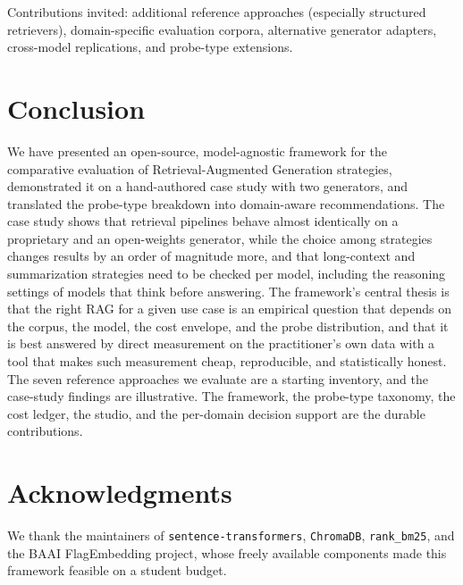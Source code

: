 \documentclass[conference,a4paper,10pt]{IEEEtran}
\begin{document}
Contributions invited: additional reference approaches (especially structured retrievers), domain-specific evaluation corpora, alternative generator adapters, cross-model replications, and probe-type extensions.

\section{Conclusion}
\label{sec:conclusion}

We have presented an open-source, model-agnostic framework for the comparative evaluation of Retrieval-Augmented Generation strategies, demonstrated it on a hand-authored case study with two generators, and translated the probe-type breakdown into domain-aware recommendations.
The case study shows that retrieval pipelines behave almost identically on a proprietary and an open-weights generator, while the choice among strategies changes results by an order of magnitude more, and that long-context and summarization strategies need to be checked per model, including the reasoning settings of models that think before answering.
The framework's central thesis is that the right RAG for a given use case is an empirical question that depends on the corpus, the model, the cost envelope, and the probe distribution, and that it is best answered by direct measurement on the practitioner's own data with a tool that makes such measurement cheap, reproducible, and statistically honest.
The seven reference approaches we evaluate are a starting inventory, and the case-study findings are illustrative.
The framework, the probe-type taxonomy, the cost ledger, the studio, and the per-domain decision support are the durable contributions.

\section*{Acknowledgments}
We thank the maintainers of \texttt{sentence-transformers}, \texttt{ChromaDB}, \texttt{rank\_bm25}, and the BAAI FlagEmbedding project, whose freely available components made this framework feasible on a student budget.



\end{document}
